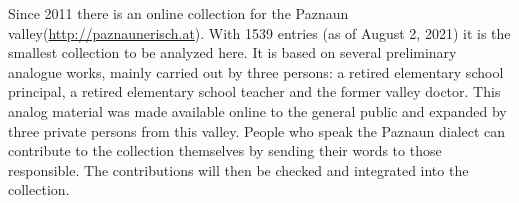 \documentclass[output=paper]{langscibook}
\begin{document}
\begin{table}
\caption{\label{tab:kathrein:1}Dialect features of the Paznaun valley in contrast to the Alemannic dialect in the adjacent Montafon region}
\end{table}
\clearpage

Since 2011 there is an online collection for the Paznaun valley\break(\url{http://paznaunerisch.at}). With 1539 entries (as of August 2, 2021) it is the smallest collection to be analyzed here. It is based on several preliminary analogue works, mainly carried out by three persons: a retired elementary school principal, a retired elementary school teacher and the former valley doctor. This analog material was made available online to the general public and expanded by three private persons from this valley. People who speak the Paznaun dialect can contribute to the collection themselves by sending their words to those responsible. The contributions will then be checked and integrated into the collection. 
\end{document}
